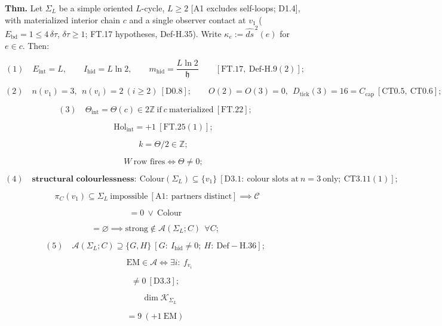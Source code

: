 \begin{theorem}\label{tag:FT-32}
\textbf{Thm.} Let $\Sigma_L$ be a simple oriented $L$-cycle, $L\ge2$ [A1 excludes self-loops; D1.4], with materialized interior chain $c$ and a single observer contact at $v_1$ ($E_{\mathrm{bd}}=1\le4\,\delta\tau$, $\delta\tau\ge1$; FT.17 hypotheses, Def-H.35). Write $\kappa_e:=\widehat{ds}^{\,2}(e)$ for $e\in c$. Then:

\[
(1)\quad E_{\mathrm{int}}=L,\qquad I_{\mathrm{hid}}=L\ln2,\qquad m_{\mathrm{hid}}=\frac{L\ln2}{\mathfrak h}\qquad[\mathrm{FT.17},\ \mathrm{Def\text{-}H.9}(2)];
\]

\[
(2)\quad n(v_1)=3,\ \ n(v_i)=2\ (i\ge2)\ [\mathrm{D0.8}];\qquad O(2)=O(3)=0,\ \ D_{\mathrm{tick}}(3)=16=C_{\mathrm{cap}}\ [\mathrm{CT0.5},\ \mathrm{CT0.6}];
\]

\[
(3)\quad\Theta_{\mathrm{int}}=\Theta(c)\in2\mathbb Z\ \text{if}\ c\ \text{materialized}\ [\mathrm{FT.22}];
\]

\[
\qquad \mathrm{Hol}_{\mathrm{int}}=+1\ [\mathrm{FT.25}(1)];
\]

\[
\qquad k=\Theta/2\in\mathbb Z;
\]

\[
\qquad W\ \text{row fires}\iff\Theta\ne0;
\]

\[
(4)\quad\textbf{structural colourlessness}:\ \mathrm{Colour}(\Sigma_L)\subseteq\{v_1\}\ [\mathrm{D3.1}:\ \text{colour slots at}\ n{=}3\ \text{only};\ \mathrm{CT3.11}(1)];
\]

\[
\ \ \pi_C(v_1)\subseteq\Sigma_L\ \text{impossible}\ [\mathrm{A1}:\ \text{partners distinct}]\implies\mathcal C
\]

\[
= 0\ \vee\ \mathrm{Colour}
\]

\[
= \varnothing\implies\text{strong}\notin\mathcal A(\Sigma_L;C)\ \ \forall C;
\]

\[
(5)\quad\mathcal A(\Sigma_L;C)\supseteq\{G,H\}\ [G:\ I_{\mathrm{hid}}\ne0;\ H:\ \mathrm{Def-H.36}];
\]

\[
\quad\mathrm{EM}\in\mathcal A\iff\exists i:\ f_{v_i}
\]

\[
\ne 0\ [\mathrm{D3.3}];
\]

\[
\quad\dim\mathcal K_{\Sigma_L}
\]

\[
= 9\ (+1\ \mathrm{EM})
\]


\end{theorem}
